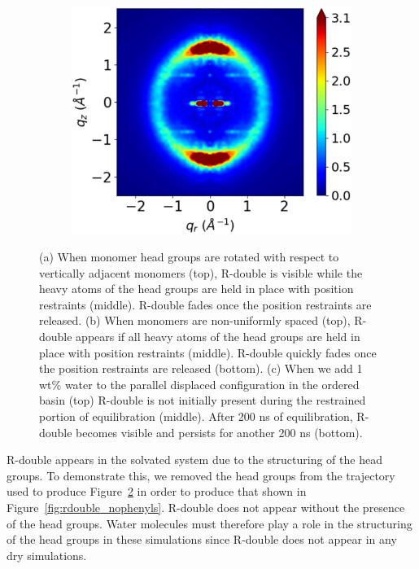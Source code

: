 \documentclass[journal=jpcbfk,manuscript=article]{achemso}
\begin{document}
\begin{figure}[!htb]
\begin{subfigure}{0.325\linewidth}
  	\caption{}\label{fig:staggered_rzplot_norestraints} 
  \end{subfigure}
  \begin{subfigure}{0.325\linewidth}
  	\centering
  	\includegraphics[width=\textwidth]{solvated_offset_rzplot_1.pdf}
  	\caption{}\label{fig:solvated_pore_rzplot_norestraints}
  \end{subfigure}
  \caption{(a) When monomer head groups are rotated with respect to vertically
	  adjacent monomers (top), R-double is visible while the heavy atoms of the head
	  groups are held in place with position restraints (middle). R-double
	  fades once the position restraints are released. (b) When monomers are
	  non-uniformly spaced (top), R-double appears if all heavy atoms of the head
	  groups are held in place with position restraints (middle). R-double quickly
	  fades once the position restraints are released (bottom). (c) When we add 1
	  wt\% water to the parallel displaced configuration in the ordered basin (top)
	  R-double is not initially present during the restrained portion of
	  equilibration (middle).  After 200 ns of equilibration, R-double becomes
	  visible and persists for another 200 ns (bottom).}\label{fig:rdouble}
  \end{figure}

  R-double appears in the solvated system due to the structuring of the head
  groups. To demonstrate this, we removed the head groups from the trajectory
  used to produce Figure~\ref{fig:solvated_pore_rzplot_norestraints} in order to
  produce that shown in Figure~\ref{fig:rdouble_nophenyls}. R-double does not
  appear without the presence of the head groups. Water molecules must therefore play a
  role in the structuring of the head groups in these simulations since R-double does not appear in
  any dry simulations.
\end{document}
